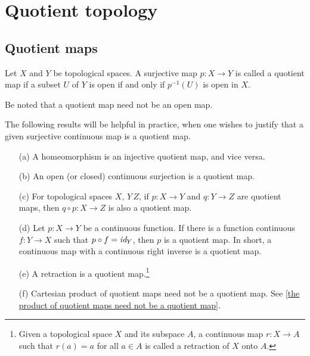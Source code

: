 \section{Quotient topology}

\subsection{Quotient maps}

\begin{defi}
    Let $X$ and $Y$ be topological spaces.
    A surjective map $p: X\rightarrow Y$ is called a quotient map if a subset $U$ of $Y$ is open if and only if $p^{-1}(U)$ is open in $X$.
\end{defi}
\begin{rmk}
    Be noted that a quotient map need not be an open map.
\end{rmk}
\begin{exmp}\label{examples of quotient maps}
    The following results will be helpful in practice, when one wishes to justify that a given surjective continuous map is a quotient map.
    \begin{enumerate}
        \item[(a)]
        {
            A homeomorphism is an injective quotient map, and vice versa.
        }
        \item[(b)]
        {
            An open (or closed) continuous surjection is a quotient map.
        }
        \item[(c)]
        {
            For topological spaces $X,\, Y\, Z$, if $p: X\rightarrow Y$ and $q: Y\rightarrow Z$ are quotient maps, then $q\circ p: X\rightarrow Z$ is also a quotient map.
        }
        \item[(d)]
        {
            Let $p: X\rightarrow Y$ be a continuous function.
            If there is a function continuous $f: Y\rightarrow X$ such that $p\circ f=\textit{id}_{Y}$, then $p$ is a quotient map.
            In short, a continuous map with a continuous right inverse is a quotient map.
        }
        \item[(e)]
        {
            A retraction is a quotient map.\footnote{Given a topological space $X$ and its subspace $A$, a continuous map $r: X\rightarrow A$ such that $r(a)=a$ for all $a\in A$ is called a retraction of $X$ onto $A$.}            
        }
        \item[(f)]
        {
            Cartesian product of quotient maps need not be a quotient map.
            See \cref{the product of quotient maps need not be a quotient map}.
        }
    \end{enumerate}
\end{exmp}

